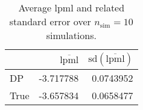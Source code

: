 \begin{table}[H]

\caption{Average lpml and related standard error over $n_{\text{sim}} = 10$ simulations.}
\centering
\begin{tabular}[t]{lrr}
\toprule
  & $\overbar{\text{lpml}}$ & $\text{sd}(\overbar{\text{lpml}})$\\
\midrule
DP & -3.717788 & 0.0743952\\
True & -3.657834 & 0.0658477\\
\bottomrule
\end{tabular}
\end{table}